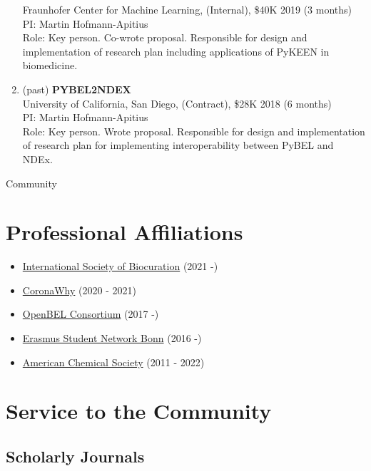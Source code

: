 \documentclass[10pt,a4paper,sans]{moderncv} %
\begin{document}
\begin{enumerate}
        Fraunhofer Center for Machine Learning, (Internal), \$40K 2019 (3 months)\\
        PI: Martin Hofmann-Apitius\\
        Role: Key person. Co-wrote proposal. Responsible for design and implementation of research plan including applications of PyKEEN in biomedicine.
    \item (past) \textbf{PYBEL2NDEX}\\
        University of California, San Diego, (Contract), \$28K 2018 (6 months)\\
        PI: Martin Hofmann-Apitius\\
        Role: Key person. Wrote proposal. Responsible for design and implementation of research plan for implementing interoperability between PyBEL and NDEx.
    \end{enumerate}

\hfill \break
{\huge Community}

    \section{Professional Affiliations}
    \begin{itemize}
        \item     \href{https://bioregistry.io/wikidata:Q23809291}{International Society of Biocuration} (2021 -)

        \item     \href{https://bioregistry.io/wikidata:Q95587147}{CoronaWhy} (2020 - 2021)

        \item     \href{https://bioregistry.io/wikidata:}{OpenBEL Consortium} (2017 -)

        \item     \href{https://bioregistry.io/wikidata:Q655757}{Erasmus Student Network Bonn} (2016 -)

        \item     \href{https://bioregistry.io/wikidata:Q247556}{American Chemical Society} (2011 - 2022)

    \end{itemize}

\section{Service to the Community}

\subsection{Scholarly Journals}
\end{document}

